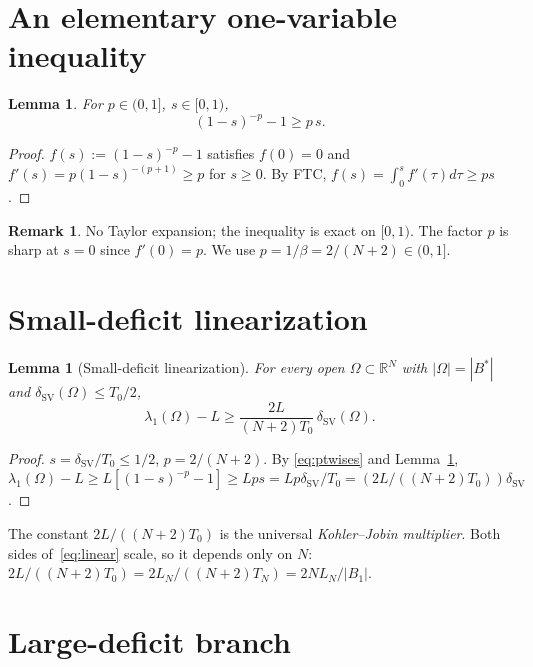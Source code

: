 \documentclass[11pt]{article}
\newtheorem{lemma}[theorem]{Lemma}
\theoremstyle{definition}
\newtheorem{remark}[theorem]{Remark}
\newcommand{\R}{\mathbb{R}}
\begin{document}
\section{An elementary one-variable inequality}

\begin{lemma}\label{lem:onevar}
For $p\in(0,1]$, $s\in[0,1)$,
\begin{equation}\label{eq:onevar}
(1-s)^{-p}-1\ge p\,s.
\end{equation}
\end{lemma}

\begin{proof}
$f(s):=(1-s)^{-p}-1$ satisfies $f(0)=0$ and
$f'(s)=p(1-s)^{-(p+1)}\ge p$ for $s\ge0$. By FTC,
$f(s)=\int_0^s f'(\tau)d\tau\ge ps$.
\end{proof}

\begin{remark}
No Taylor expansion; the inequality is exact on $[0,1)$. The factor $p$
is sharp at $s=0$ since $f'(0)=p$. We use $p=1/\beta=2/(N+2)\in(0,1]$.
\end{remark}

\section{Small-deficit linearization}

\begin{lemma}[Small-deficit linearization]\label{lem:linear}
For every open $\Omega\subset\R^N$ with $|\Omega|=|B^*|$ and
$\delta_{\mathrm{SV}}(\Omega)\le T_0/2$,
\begin{equation}\label{eq:linear}
\lambda_1(\Omega)-L\ge\frac{2L}{(N+2)T_0}\,\delta_{\mathrm{SV}}(\Omega).
\end{equation}
\end{lemma}

\begin{proof}
$s=\delta_{\mathrm{SV}}/T_0\le1/2$, $p=2/(N+2)$. By \eqref{eq:ptwises}
and Lemma~\ref{lem:onevar},
$\lambda_1(\Omega)-L\ge L[(1-s)^{-p}-1]\ge Lps=Lp\delta_{\mathrm{SV}}/T_0
=(2L/((N+2)T_0))\delta_{\mathrm{SV}}$.
\end{proof}

The constant $2L/((N+2)T_0)$ is the universal \emph{Kohler--Jobin
multiplier}. Both sides of~\eqref{eq:linear} scale, so it depends only
on $N$: $2L/((N+2)T_0)=2L_N/((N+2)T_N)=2NL_N/|B_1|$.

\section{Large-deficit branch}
\end{document}
